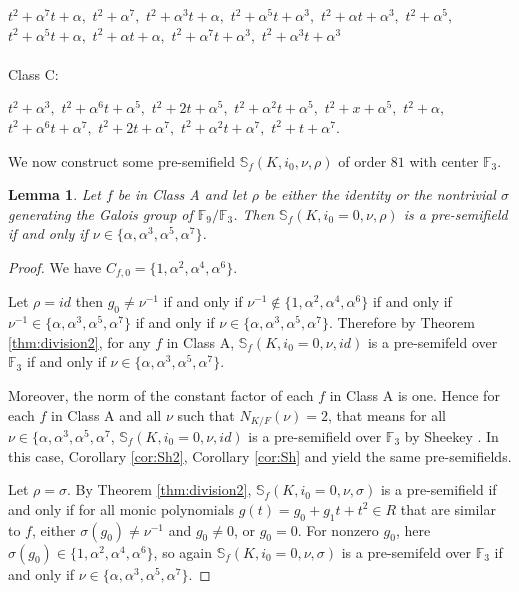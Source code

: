 \documentclass[12pt]{amsart}
\theoremstyle{plain}
\newtheorem{lemma}[theorem]{Lemma}
\theoremstyle{definition}
\numberwithin{equation}{section}
\numberwithin{figure}{section}
\begin{document}
       $ t^2 + \alpha^7t+ \alpha,$
$t^2 + \alpha^7,$
$ t^2 + \alpha^3 t + \alpha,$
$t^2 + \alpha^5t + \alpha^3,$
 $t^2 + \alpha t + \alpha^3,$
$ t^2 + \alpha^5,$
 $t^2 + \alpha^5t + \alpha,$
 $ t^2 + \alpha t + \alpha,$
$  t^2 + \alpha^7t + \alpha^3,$
$  t^2 + \alpha^3t + \alpha^3$
\\\\
Class C:

       $ t^2 + \alpha^3,$
$ t^2 + \alpha^6t + \alpha^5,$
$ t^2 + 2 t + \alpha^5,$
$ t^2 + \alpha^2t + \alpha^5,$
$ t^2 + x + \alpha^5,$
$ t^2 + \alpha,$
$ t^2 + \alpha^6t + \alpha^7,$
 $t^2 + 2 t + \alpha^7,$
 $t^2 + \alpha^2t + \alpha^7,$
$t^2 + t + \alpha^7$.



We now construct some  pre-semifield $\mathbb{S}_f(K,i_0,\nu,\rho)$ of order $81$  with center $\mathbb{F}_3$. 


\begin{lemma}
Let $f$ be in Class A and let $\rho$ be either the identity or the nontrivial $\sigma$ generating the Galois group of $\mathbb{F}_9/\mathbb{F}_3$. Then $\mathbb{S}_f(K,i_0=0,\nu,\rho)$ is a pre-semifield
if and only if
$\nu \in \{ \alpha, \alpha^3,\alpha^5, \alpha^7  \}$.
\end{lemma}

\begin{proof}
 We have $C_{f,{0}}=\{ 1,\alpha^2, \alpha^4, \alpha^6  \}$.

Let $\rho=id$ then $g_{0}\not =\nu^{-1}$ if and only if $\nu^{-1}\not\in \{ 1, \alpha^2,\alpha^4, \alpha^6  \}$ if and only if
 $\nu^{-1}\in \{ \alpha, \alpha^3,\alpha^5, \alpha^7 \}$ if and only if $\nu\in \{ \alpha, \alpha^3,\alpha^5, \alpha^7 \}$. Therefore by Theorem \ref{thm:division2}, for any $f$ in Class A,
$\mathbb{S}_f(K,i_0=0,\nu,id)$  is a  pre-semifeld over $\mathbb{F}_3$ if and only if $\nu\in \{ \alpha, \alpha^3,\alpha^5, \alpha^7 \}$.


Moreover, the norm of the constant factor of each $f$ in Class A is one. Hence for each  $f$ in Class A and all $\nu$ such that $N_{K/F}(\nu)=2$, that means for all $\nu \in \{ \alpha, \alpha^3,\alpha^5, \alpha^7 $, $\mathbb{S}_f(K,i_0=0,\nu,id)$ is a pre-semifield over $\mathbb{F}_3$  by Sheekey
\cite[Theorem 7]{Sheekey}.  In this case, Corollary \ref{cor:Sh2}, Corollary \ref{cor:Sh} and \cite[Theorem 7]{Sheekey}  yield the same pre-semifields.

Let $\rho=\sigma$. By Theorem \ref{thm:division2},
$\mathbb{S}_f(K,i_0=0,\nu,\sigma)$  is a pre-semifield  if and only if  for all
 monic polynomials  $g(t)=g_0+g_1t+t^2\in R$ that are similar to $f$, either $\sigma(g_{0})\not =\nu^{-1}$ and $g_{0}\not=0$, or $g_{0}=0$.
 For nonzero $g_0$, here $\sigma(g_{0})\in\{ 1,\alpha^2, \alpha^4, \alpha^6  \}$, so again $\mathbb{S}_f(K,i_0=0,\nu,\sigma)$  is a pre-semifeld over $\mathbb{F}_3$ if and only if $\nu\in \{ \alpha, \alpha^3,\alpha^5, \alpha^7 \}$.

\end{proof}
\end{document}
